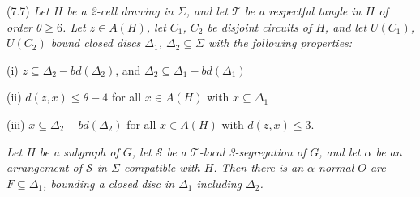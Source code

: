 \stmt
(7.7) \textit{Let $H$ be a 2-cell drawing in $\Sigma$, and let $\mathscr{T}$ be a respectful tangle in $H$ of order $\theta \ge 6$. Let $z \in A(H)$, let $C_1$, $C_2$ be disjoint circuits of $H$, and let $U(C_1)$, $U(C_2)$ bound closed discs $\Delta_1$, $\Delta_2 \subseteq \Sigma$ with the following properties:}

\hspace*{12pt}(i) $z \subseteq \Delta_2 - bd(\Delta_2)$, and $\Delta_2 \subseteq \Delta_1 - bd(\Delta_1)$

\hspace*{12pt}(ii) $d(z, x) \le \theta - 4$ for all $x \in A(H)$ with $x \subseteq \Delta_1$

\hspace*{12pt}(iii) $x \subseteq \Delta_2 - bd(\Delta_2)$ for all $x \in A(H)$ with $d(z, x) \le 3$.

\textit{Let $H$ be a subgraph of $G$, let $\mathscr{S}$ be a $\mathscr{T}$-local 3-segregation of $G$, and let $\alpha$ be an arrangement of $\mathscr{S}$ in $\Sigma$ compatible with $H$. Then there is an $\alpha$-normal $O$-arc $F \subseteq \Delta_1$, bounding a closed disc in $\Delta_1$ including $\Delta_2$.}
